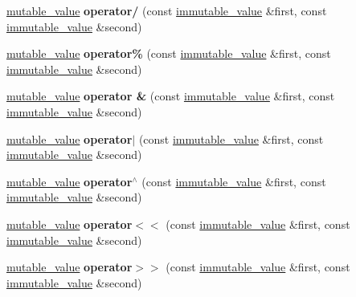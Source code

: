 \begin{DoxyCompactItemize}
\item 
\mbox{\label{classdialog_1_1mutable__value_aca65e78b0627d39e1d8a5c65f8832f00}} 
\hyperlink{classdialog_1_1mutable__value}{mutable\+\_\+value} {\bfseries operator/} (const \hyperlink{classdialog_1_1immutable__value}{immutable\+\_\+value} \&first, const \hyperlink{classdialog_1_1immutable__value}{immutable\+\_\+value} \&second)
\item 
\mbox{\label{classdialog_1_1mutable__value_acbe003fe899f51f80bb8ed58a4d2c100}} 
\hyperlink{classdialog_1_1mutable__value}{mutable\+\_\+value} {\bfseries operator\%} (const \hyperlink{classdialog_1_1immutable__value}{immutable\+\_\+value} \&first, const \hyperlink{classdialog_1_1immutable__value}{immutable\+\_\+value} \&second)
\item 
\mbox{\label{classdialog_1_1mutable__value_a99dd5f11ce5aa06e3309e8e59487fdd5}} 
\hyperlink{classdialog_1_1mutable__value}{mutable\+\_\+value} {\bfseries operator \&} (const \hyperlink{classdialog_1_1immutable__value}{immutable\+\_\+value} \&first, const \hyperlink{classdialog_1_1immutable__value}{immutable\+\_\+value} \&second)
\item 
\mbox{\label{classdialog_1_1mutable__value_a507fc993fbcfcf24603f5ce0569142d9}} 
\hyperlink{classdialog_1_1mutable__value}{mutable\+\_\+value} {\bfseries operator$\vert$} (const \hyperlink{classdialog_1_1immutable__value}{immutable\+\_\+value} \&first, const \hyperlink{classdialog_1_1immutable__value}{immutable\+\_\+value} \&second)
\item 
\mbox{\label{classdialog_1_1mutable__value_a76d916ee2130786f5bf310d7160e23f3}} 
\hyperlink{classdialog_1_1mutable__value}{mutable\+\_\+value} {\bfseries operator$^\wedge$} (const \hyperlink{classdialog_1_1immutable__value}{immutable\+\_\+value} \&first, const \hyperlink{classdialog_1_1immutable__value}{immutable\+\_\+value} \&second)
\item 
\mbox{\label{classdialog_1_1mutable__value_ae852f55df61e179c6418835da3da4797}} 
\hyperlink{classdialog_1_1mutable__value}{mutable\+\_\+value} {\bfseries operator$<$$<$} (const \hyperlink{classdialog_1_1immutable__value}{immutable\+\_\+value} \&first, const \hyperlink{classdialog_1_1immutable__value}{immutable\+\_\+value} \&second)
\item 
\mbox{\label{classdialog_1_1mutable__value_a61672ff559824ff840d4d766b9ab0719}} 
\hyperlink{classdialog_1_1mutable__value}{mutable\+\_\+value} {\bfseries operator$>$$>$} (const \hyperlink{classdialog_1_1immutable__value}{immutable\+\_\+value} \&first, const \hyperlink{classdialog_1_1immutable__value}{immutable\+\_\+value} \&second)
\end{DoxyCompactItemize}
